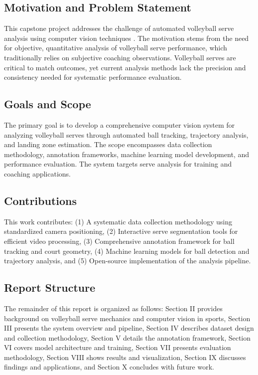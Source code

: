 \subsection{Motivation and Problem Statement}
This capstone project addresses the challenge of automated volleyball serve analysis using computer vision techniques \cite{IEEEexample:article_typical}. The motivation stems from the need for objective, quantitative analysis of volleyball serve performance, which traditionally relies on subjective coaching observations. Volleyball serves are critical to match outcomes, yet current analysis methods lack the precision and consistency needed for systematic performance evaluation.

\subsection{Goals and Scope}
The primary goal is to develop a comprehensive computer vision system for analyzing volleyball serves through automated ball tracking, trajectory analysis, and landing zone estimation. The scope encompasses data collection methodology, annotation frameworks, machine learning model development, and performance evaluation. The system targets serve analysis for training and coaching applications.

\subsection{Contributions}
This work contributes: (1) A systematic data collection methodology using standardized camera positioning, (2) Interactive serve segmentation tools for efficient video processing, (3) Comprehensive annotation framework for ball tracking and court geometry, (4) Machine learning models for ball detection and trajectory analysis, and (5) Open-source implementation of the analysis pipeline.

\subsection{Report Structure}
The remainder of this report is organized as follows: Section II provides background on volleyball serve mechanics and computer vision in sports, Section III presents the system overview and pipeline, Section IV describes dataset design and collection methodology, Section V details the annotation framework, Section VI covers model architecture and training, Section VII presents evaluation methodology, Section VIII shows results and visualization, Section IX discusses findings and applications, and Section X concludes with future work.
